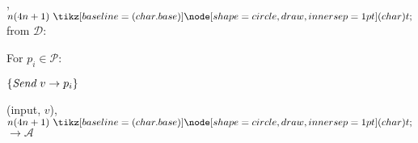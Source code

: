\begin{bbox}[title={$\F_{\msf{async-bcast}} (\mathcal{D}, \mathcal{P}=p_1,...,p_n)$}]

\OnInput {}, $n(4n+1) \token$ from $\mathcal{D}$:
	\begin{renumerate}
	\item For $p_i \in \mathcal{P}$:
		\begin{ritemize}	
		\item \Eventually $\{\emph{Send}~ v \rightarrow p_i\}$ 
		\end{ritemize}

	\item \Leak (input, $v$), $n(4n+1) \token$ $\rightarrow \mathcal{A}$
	\end{renumerate}

\end{bbox}

